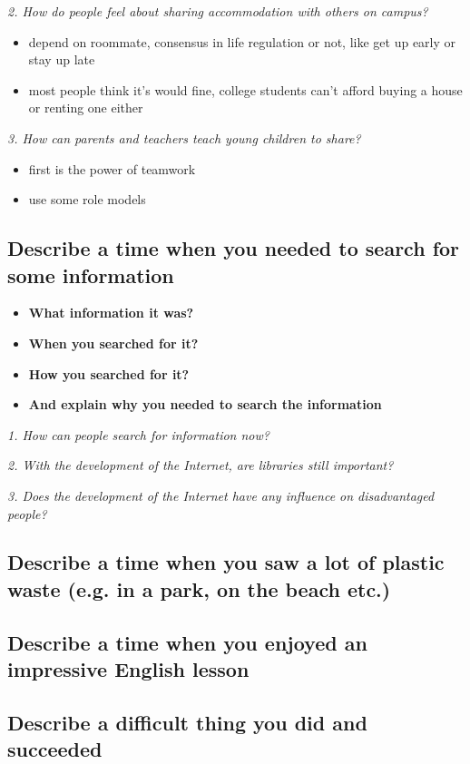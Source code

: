 \documentclass[conference]{IEEEtran}
\begin{document}
\textit{2. How do people feel about sharing accommodation with others on campus?}
\begin{itemize}
    \item depend on roommate, consensus in life regulation or not, like get up early or stay up late
    \item most people think it's would fine, college students can't afford buying a house or renting one either
\end{itemize}

\textit{3. How can parents and teachers teach young children to share?}
\begin{itemize}
    \item first is the power of teamwork
    \item use some role models
\end{itemize}

\subsection{Describe a time when you needed to search for some information}
\begin{itemize}
    \item \textbf{What information it was?}
    \item \textbf{When you searched for it?}
    \item \textbf{How you searched for it?}
    \item \textbf{And explain why you needed to search the information}
\end{itemize}

\textit{1. How can people search for information now?}

\textit{2. With the development of the Internet, are libraries still important?}

\textit{3. Does the development of the Internet have any influence on disadvantaged people?}

\subsection{Describe a time when you saw a lot of plastic waste (e.g. in a park, on the beach
etc.)}
\subsection{Describe a time when you enjoyed an impressive English lesson}
\subsection{Describe a difficult thing you did and succeeded}
\end{document}
